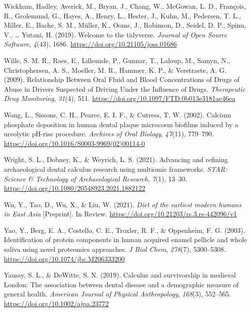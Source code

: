 \documentclass[
  letterpaper,
]{book}
\newlength{\cslhangindent}
\newlength{\cslentryspacingunit} %
\newenvironment{CSLReferences}[2] %
 {%
  \setlength{\parindent}{0pt}
  \ifodd #1
  \let\oldpar\par
  \def\par{\hangindent=\cslhangindent\oldpar}
  \fi
  \setlength{\parskip}{#2\cslentryspacingunit}
 }%
 {}
\begin{document}
\begin{CSLReferences}{1}{0}
\leavevmode{}%
Wickham, Hadley, Averick, M., Bryan, J., Chang, W., McGowan, L. D.,
François, R., Grolemund, G., Hayes, A., Henry, L., Hester, J., Kuhn, M.,
Pedersen, T. L., Miller, E., Bache, S. M., Müller, K., Ooms, J.,
Robinson, D., Seidel, D. P., Spinu, V., \ldots{} Yutani, H. (2019).
Welcome to the {tidyverse}. \emph{Journal of Open Source Software},
\emph{4}(43), 1686. \url{https://doi.org/10.21105/joss.01686}

\leavevmode{}%
Wille, S. M. R., Raes, E., Lillsunde, P., Gunnar, T., Laloup, M., Samyn,
N., Christophersen, A. S., Moeller, M. R., Hammer, K. P., \& Verstraete,
A. G. (2009). Relationship {Between Oral Fluid} and {Blood
Concentrations} of {Drugs} of {Abuse} in {Drivers Suspected} of {Driving
Under} the {Influence} of {Drugs}. \emph{Therapeutic Drug Monitoring},
\emph{31}(4), 511. \url{https://doi.org/10.1097/FTD.0b013e3181ae46ea}

\leavevmode{}%
Wong, L., Sissons, C. H., Pearce, E. I. F., \& Cutress, T. W. (2002).
Calcium phosphate deposition in human dental plaque microcosm biofilms
induced by a ureolytic {pH-rise} procedure. \emph{Archives of Oral
Biology}, \emph{47}(11), 779--790.
\url{https://doi.org/10.1016/S0003-9969(02)00114-0}

\leavevmode{}%
Wright, S. L., Dobney, K., \& Weyrich, L. S. (2021). Advancing and
refining archaeological dental calculus research using multiomic
frameworks. \emph{STAR: Science \& Technology of Archaeological
Research}, \emph{7}(1), 13--30.
\url{https://doi.org/10.1080/20548923.2021.1882122}

\leavevmode{}%
Wu, Y., Tao, D., Wu, X., \& Liu, W. (2021). \emph{Diet of the earliest
modern humans in {East Asia}} {[}Preprint{]}. {In Review}.
\url{https://doi.org/10.21203/rs.3.rs-442096/v1}

\leavevmode{}%
Yao, Y., Berg, E. A., Costello, C. E., Troxler, R. F., \& Oppenheim, F.
G. (2003). Identification of protein components in human acquired enamel
pellicle and whole saliva using novel proteomics approaches. \emph{J
Biol Chem}, \emph{278}(7), 5300--5308.
\url{https://doi.org/10.1074/jbc.M206333200}

\leavevmode{}%
Yaussy, S. L., \& DeWitte, S. N. (2019). Calculus and survivorship in
medieval {London}: {The} association between dental disease and a
demographic measure of general health. \emph{American Journal of
Physical Anthropology}, \emph{168}(3), 552--565.
\url{https://doi.org/10.1002/ajpa.23772}


\end{CSLReferences}
\end{document}
